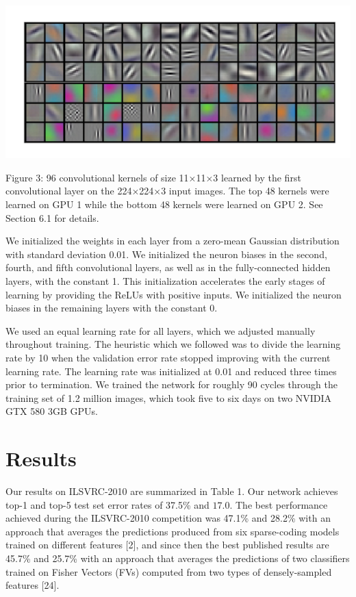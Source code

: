 \documentclass[12pt,a4paper,UTF8,twoside]{book}
\begin{document}
\begin{center}\includegraphics[width=0.7\linewidth]{img/01-03} \end{center}

Figure 3: 96 convolutional kernels of size 11×11×3 learned by the first convolutional layer on the 224×224×3 input images. The top 48 kernels were learned on GPU 1 while the bottom 48 kernels were learned on GPU 2. See Section 6.1 for details.

We initialized the weights in each layer from a zero-mean Gaussian distribution with standard deviation 0.01. We initialized the neuron biases in the second, fourth, and fifth convolutional layers, as well as in the fully-connected hidden layers, with the constant 1. This initialization accelerates the early stages of learning by providing the ReLUs with positive inputs. We initialized the neuron biases in the remaining layers with the constant 0.

We used an equal learning rate for all layers, which we adjusted manually throughout training. The heuristic which we followed was to divide the learning rate by 10 when the validation error rate stopped improving with the current learning rate. The learning rate was initialized at 0.01 and reduced three times prior to termination. We trained the network for roughly 90 cycles through the training set of 1.2 million images, which took five to six days on two NVIDIA GTX 580 3GB GPUs.

\hypertarget{results}{%
\section{Results}\label{results}}

Our results on ILSVRC-2010 are summarized in Table 1. Our network achieves top-1 and top-5 test set error rates of 37.5\% and \(17.0%
\). The best performance achieved during the ILSVRC-2010 competition was 47.1\% and 28.2\% with an approach that averages the predictions produced from six sparse-coding models trained on different features {[}2{]}, and since then the best published results are 45.7\% and 25.7\% with an approach that averages the predictions of two classifiers trained on Fisher Vectors (FVs) computed from two types of densely-sampled features {[}24{]}.
\end{document}
